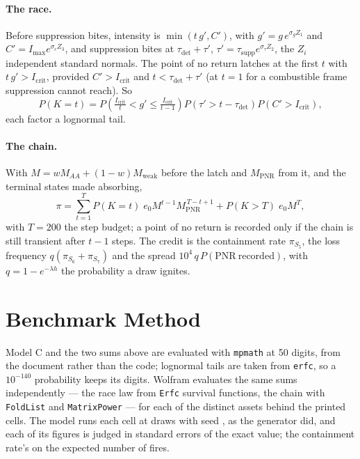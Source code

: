 \documentclass[11pt,a4paper]{article}
\begin{document}
\paragraph{The race.} Before suppression bites, intensity is $\min(t\,g',C')$, with
$g'=g\,e^{\sigma_g Z_1}$ and $C'=I_{\max}e^{\sigma_c Z_3}$, and suppression bites at
$\tau_{\mathrm{det}}+\tau'$, $\tau'=\tau_{\mathrm{supp}}e^{\sigma_\tau Z_2}$, the $Z_i$
independent standard normals. The point of no return latches at the first $t$ with
$t\,g'>I_{\mathrm{crit}}$, provided $C'>I_{\mathrm{crit}}$ and $t<\tau_{\mathrm{det}}+\tau'$
(at $t=1$ for a combustible frame suppression cannot reach). So
\begin{equation}
P(K=t)=P\!\left(\tfrac{I_{\mathrm{crit}}}{t}<g'\le\tfrac{I_{\mathrm{crit}}}{t-1}\right)
P\!\left(\tau'>t-\tau_{\mathrm{det}}\right)P\!\left(C'>I_{\mathrm{crit}}\right),
\end{equation}
each factor a lognormal tail.

\paragraph{The chain.} With $M=wM_{AA}+(1-w)M_{\mathrm{weak}}$ before the latch and
$M_{\mathrm{PNR}}$ from it, and the terminal states made absorbing,
\begin{equation}
\pi=\sum_{t=1}^{T}P(K=t)\;e_0M^{t-1}M_{\mathrm{PNR}}^{\,T-t+1}+P(K>T)\;e_0M^{T},
\end{equation}
with $T=200$ the step budget; a point of no return is recorded only if the chain is
still transient after $t-1$ steps. The credit is the containment rate $\pi_{S_5}$,
the loss frequency $q(\pi_{S_6}+\pi_{S_7})$ and the spread $10^4\,q\,P(\mathrm{PNR\ recorded})$,
with $q=1-e^{-\lambda h}$ the probability a draw ignites.

\section{Benchmark Method}

Model C and the two sums above are evaluated with \texttt{mpmath} at 50 digits, from
the document rather than the code; lognormal tails are taken from \texttt{erfc}, so
a $10^{-140}$ probability keeps its digits. Wolfram evaluates the same sums
independently --- the race law from \texttt{Erfc} survival functions, the chain with
\texttt{FoldList} and \texttt{MatrixPower} --- for each of the \bmAssets{} distinct
assets behind the \bmCells{} printed cells. The model runs each cell at
\bmNSim{} draws with seed \bmSeed, as the generator did, and each of its figures is
judged in standard errors of the exact value; the containment rate's on the expected
number of fires.
\end{document}

